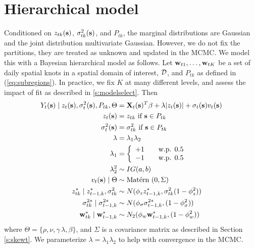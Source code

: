 \documentclass[11pt]{article}
\begin{document}
\section{Hierarchical model}\label{s:hier}
Conditioned on $z_{tk}(\mbox{\bf s})$, $\sigma^2_{tk}(\mbox{\bf s})$, and $P_{tk}$, the marginal distributions are Gaussian and the joint distribution multivariate Gaussian.
However, we do not fix the partitions, they are treated as unknown and updated in the MCMC.
We model this with a Bayesian hierarchical model as follows.
Let $\mbox{\bf w}_{t1}, \ldots, \mbox{\bf w}_{tK}$ be a set of daily spatial knots in a spatial domain of interest, ${\cal D}$, and $P_{tk}$ as defined in (\ref{eq:subregions}).
In practice, we fix $K$ at many different levels, and assess the impact of fit as described in \ref{s:modelselect}.
Then
\begin{align}
   Y_t(\mbox{\bf s}) \mid z_{t}(\mbox{\bf s}), \sigma_t^2(\mbox{\bf s}), P_{tk}, \Theta &= \mbox{\bf X}_t(\mbox{\bf s})^T \beta + \lambda |z_t(\mbox{\bf s})| + \sigma_t(\mbox{\bf s}) v_t(\mbox{\bf s}) \label{eq:hier}\\
   z_t(\mbox{\bf s}) &= z_{tk} \text{ if } \mbox{\bf s} \in P_{tk}\nonumber\\
   \sigma^2_{t}(\mbox{\bf s}) &= \sigma^2_{tk} \text{ if } \mbox{\bf s} \in P_{tk}\nonumber\\
   \lambda &= \lambda_1 \lambda_2\nonumber\\
   \lambda_1 &= \left\{ \begin{array}{ll}
      +1 \quad & \text{w.p. } 0.5\\
      -1 \quad & \text{w.p. } 0.5
   \end{array}\right.\nonumber\\
   \lambda^2_2 & \sim IG(a, b)\nonumber\\
   v_t(\mbox{\bf s}) \mid \Theta &\sim \mbox{Mat$\acute{\mbox{e}}$rn }(0, \Sigma)\nonumber\\
   z^*_{tk} \mid z^*_{t-1, k}, \sigma^2_{tk} &\sim N(\phi_z z^*_{t-1, k}, \sigma^2_{tk} (1 - \phi_z^2))\nonumber\\
   \sigma^{2*}_{tk} \mid \sigma^{2*}_{t-1, k} &\sim N(\phi_\sigma \sigma^{2*}_{t-1, k}, (1 - \phi_\sigma^2))\nonumber\\
   \mbox{\bf w}^*_{tk} \mid \mbox{\bf w}^*_{t-1, k} &\sim N_2(\phi_w \mbox{\bf w}^*_{t-1, k}, (1 - \phi_w^2)) \nonumber
\end{align}
where $\Theta = \{\rho, \nu, \gamma\, \lambda, \beta\}$, and $\Sigma$ is a \Matern covariance matrix as described in Section \ref{s:skewt}.
We parameterize $\lambda = \lambda_1 \lambda_2$ to help with convergence in the MCMC.
\end{document}
